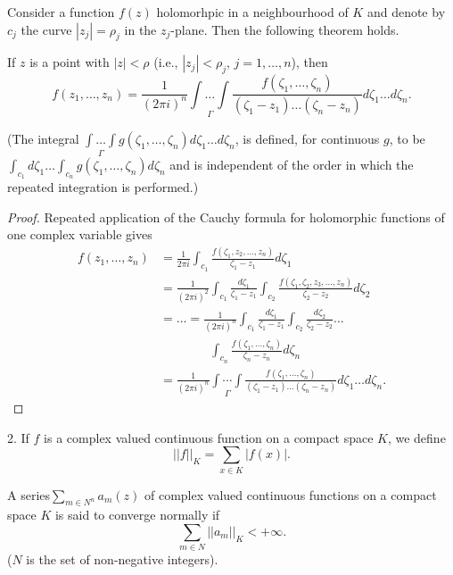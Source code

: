 Consider a function $f(z)$ holomorhpic in a neighbourhood of $K$ and
denote by $c_j$ the curve $|z_j| = \rho_j$ in the $z_j$-plane. Then
the following theorem holds.

\medskip
{}
If $z$ is a point with $|z| < \rho$ (i.e., $|z_j| < \rho_j$,
$j=1,\ldots, n$), then 
$$
f(z_1,\ldots, z_n) = \frac{1}{(2\pi i)^n}
\underset{\Gamma}{\int\ldots\int} \frac{f(\zeta_1, \ldots,
  \zeta_n)}{(\zeta_1 -z_1) \ldots (\zeta_n - z_n)} d \zeta_1 \ldots d
\zeta_n. 
$$

(The integral $\underset{\Gamma}{\int\ldots\int} g(\zeta_1, \ldots,
\zeta_n) d\zeta_1 \ldots d\zeta_n$, is defined, for continuous $g$, to
be $\int_{c_1} d \zeta_1 \ldots \int_{c_n} g(\zeta_1, \ldots, \zeta_n)
d\zeta_n$ and is independent of the order in which the repeated
integration is performed.) 

\begin{proof}
Repeated application of the Cauchy formula for holomorphic functions
of one complex variable gives
\begin{align*}
f(z_1,\ldots, z_n) & = \frac{1}{2\pi i} \int_{c_1} \frac{f(\zeta_1,
  z_2, \ldots, z_n)}{\zeta_1 - z_1} d \zeta_1\\
& = \frac{1}{(2\pi i)^2} \int_{c_1} \frac{d\zeta_1}{\zeta_1-z_1}
\int_{c_2} \frac{f(\zeta_1, \zeta_2, z_3, \ldots, z_n)}{\zeta_2 - z_2}
d \zeta_2 \\
& = \ldots = \frac{1}{(2\pi i)^n} \int_{c_1} \frac{d\zeta_1}{\zeta_1
  -z_1} \int_{c_2} \frac{d\zeta_2}{\zeta_2 - z_2} \ldots\\
&\qquad\qquad\int_{c_n}
\frac{f(\zeta_1, \ldots, \zeta_n)}{\zeta_n -z_n} d \zeta_n\\
& =  \frac{1}{(2\pi i)^n} \underset{\Gamma}{\int\cdots\int}
\frac{f(\zeta_1, \ldots, \zeta_n)}{(\zeta_1-z_1) \ldots (\zeta_n -
  z_n)} d \zeta_1 \ldots d \zeta_n.
\end{align*}
\end{proof}

2. If $f$ is a complex valued continuous function on a compact space
$K$, we define
$$
||f||_K = \sum\limits_{x\in K} |f(x)|.
$$

\begin{defi*}
A series\pageoriginale $\sum\limits_{m\in N^n} a_m (z)$ of complex
valued continuous functions on a compact space $K$ is said to converge
normally if 
$$
\sum\limits_{m\in N}||a_m||_K < + \infty.
$$
($N$ is the set of non-negative integers).
\end{defi*}


